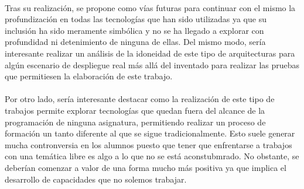 \documentclass[12pt, a4paper]{article}
\begin{document}
        \paragraph{}
        Tras su realización, se propone como vías futuras para continuar con el mismo la profundización en todas las tecnologías que han sido utilizadas ya que su inclusión ha sido meramente simbólica y no se ha llegado a explorar con profundidad ni detenimiento de ninguna de ellas. Del mismo modo, sería interesante realizar un análisis de la idoneidad de este tipo de arquitecturas para algún escenario de despliegue real más allá del inventado para realizar las pruebas que permitiesen la elaboración de este trabajo.

        \paragraph{}
        Por otro lado, sería interesante destacar como la realización de este tipo de trabajos permite explorar tecnologías que quedan fuera del alcance de la programación de ninguna asignatura, permitiendo realizar un proceso de formación un tanto diferente al que se sigue tradicionalmente. Esto suele generar mucha contronversia en los alumnos puesto que tener que enfrentarse a trabajos con una temática libre es algo a lo que no se está aconstubmrado. No obstante, se deberían comenzar a valor de una forma mucho más positiva ya que implica el desarrollo de capacidades que no solemos trabajar.

\end{document}
